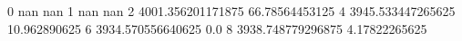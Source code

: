 0 nan nan
1 nan nan
2 4001.356201171875 66.78564453125
4 3945.533447265625 10.962890625
6 3934.570556640625 0.0
8 3938.748779296875 4.17822265625
